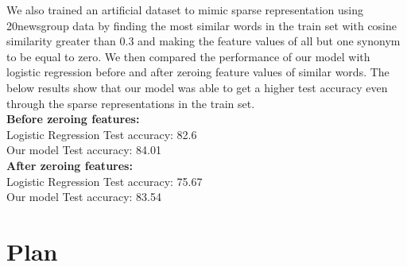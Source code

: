 \begin{table}[htbp]
\centering
{}
\caption{\label{tab:widgets}Set-Accuracy and Instance-F1 Results.}
\end{table}

\noindent We also trained an artificial dataset to mimic sparse representation using 20newsgroup data by finding the most similar words in the train set with cosine similarity greater than 0.3 and making the feature values of all but one synonym to be equal to zero. We then compared the performance of our model with logistic regression before and after zeroing feature values of similar words. The below results show that our model was able to get a higher test accuracy even through the sparse representations in the train set.\\

\noindent \textbf{Before zeroing features:}\\
Logistic Regression Test accuracy: 82.6\\
Our model Test accuracy: 84.01\\

\noindent \textbf{After zeroing features:}\\
Logistic Regression Test accuracy: 75.67\\
Our model Test accuracy: 83.54\\

\chapter{Plan}


